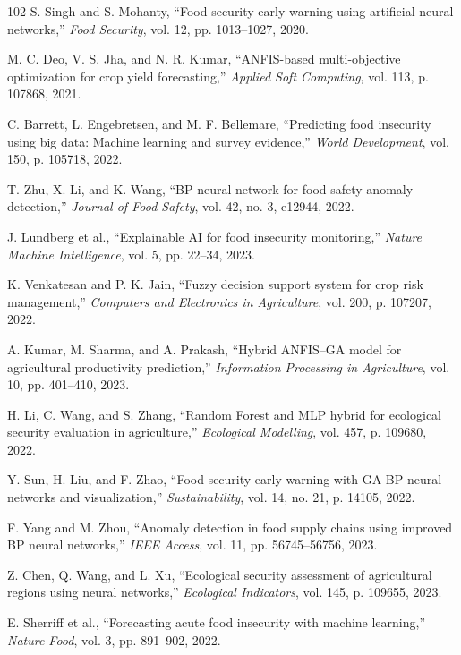 \documentclass[preprint,12pt]{elsarticle}
\begin{document}
\begin{thebibliography}{102}
		S. Singh and S. Mohanty, ``Food security early warning using artificial neural networks,'' \emph{Food Security}, vol. 12, pp. 1013--1027, 2020.
		
		M. C. Deo, V. S. Jha, and N. R. Kumar, ``ANFIS-based multi-objective optimization for crop yield forecasting,'' \emph{Applied Soft Computing}, vol. 113, p. 107868, 2021.
		
		C. Barrett, L. Engebretsen, and M. F. Bellemare, ``Predicting food insecurity using big data: Machine learning and survey evidence,'' \emph{World Development}, vol. 150, p. 105718, 2022.
		
		T. Zhu, X. Li, and K. Wang, ``BP neural network for food safety anomaly detection,'' \emph{Journal of Food Safety}, vol. 42, no. 3, e12944, 2022.
		
		J. Lundberg et al., ``Explainable AI for food insecurity monitoring,'' \emph{Nature Machine Intelligence}, vol. 5, pp. 22--34, 2023.
		
		K. Venkatesan and P. K. Jain, ``Fuzzy decision support system for crop risk management,'' \emph{Computers and Electronics in Agriculture}, vol. 200, p. 107207, 2022.
		
		A. Kumar, M. Sharma, and A. Prakash, ``Hybrid ANFIS--GA model for agricultural productivity prediction,'' \emph{Information Processing in Agriculture}, vol. 10, pp. 401--410, 2023.
		
		H. Li, C. Wang, and S. Zhang, ``Random Forest and MLP hybrid for ecological security evaluation in agriculture,'' \emph{Ecological Modelling}, vol. 457, p. 109680, 2022.
		
		Y. Sun, H. Liu, and F. Zhao, ``Food security early warning with GA-BP neural networks and visualization,'' \emph{Sustainability}, vol. 14, no. 21, p. 14105, 2022.
		
		F. Yang and M. Zhou, ``Anomaly detection in food supply chains using improved BP neural networks,'' \emph{IEEE Access}, vol. 11, pp. 56745--56756, 2023.
		
		Z. Chen, Q. Wang, and L. Xu, ``Ecological security assessment of agricultural regions using neural networks,'' \emph{Ecological Indicators}, vol. 145, p. 109655, 2023.
		
		E. Sherriff et al., ``Forecasting acute food insecurity with machine learning,'' \emph{Nature Food}, vol. 3, pp. 891--902, 2022.
		

\end{thebibliography}
\end{document}
